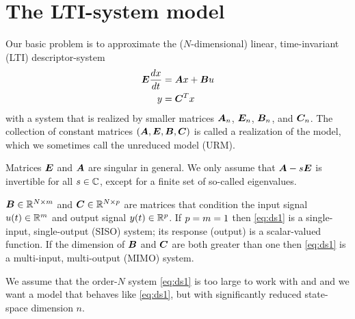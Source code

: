 \section{The LTI-system model}
         Our basic problem is to approximate the ($N$-dimensional)  linear, time-invariant (LTI) descriptor-system
         \begin{equation}
         \begin{aligned}
                \bm{E}\frac{dx}{dt} &=  \bm{A} x + \bm{B} u\\
                y &= \bm{C}^T x
        \end{aligned}
        \label{eq:ds1}
        \end{equation}      
with a system that is realized by smaller matrices $\bm{A}_n$, $\bm{E}_n$, $\bm{B}_n$, and $\bm{C}_n$.  
The collection of constant matrices $(\bm{A},\bm{E},\bm{B},\bm{C})$ is called a
realization  of the model, which we sometimes call the unreduced model (URM).

 Matrices $\bm{E}$ and $\bm{A}$ are singular in general.   We only  assume that $\bm{A}-s\bm{E}$ is invertible for all $s\in\mathbb{C}$, except for a finite set of so-called eigenvalues.  

\smallskip
 $\bm{B}\in\mathbb{R}^{N\times m}$  and  $\bm{C}\in \mathbb{R}^{N\times p}$ are matrices that condition the input signal $u(t)\in\mathbb{R}^m$ and output signal $y(t)\in\mathbb{R}^{p}$.  
 If $p=m = 1$ then \eqref{eq:ds1} is a single-input, single-output (SISO) system; its response (output) is a scalar-valued function.  If the dimension of $\bm{B}$ and $\bm{C}$ are both greater than one then \eqref{eq:ds1} is a multi-input, multi-output (MIMO) system. 

\smallskip
 We assume that the order-$N$ system \eqref{eq:ds1} is too large to work with and and we want a model that behaves like \eqref{eq:ds1}, but with significantly reduced state-space dimension $n$.  

